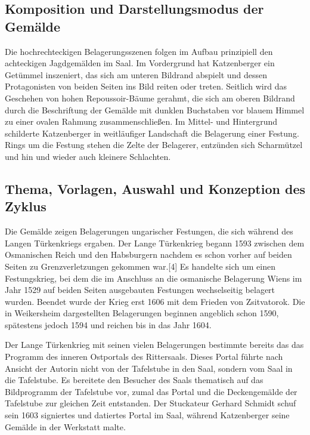 \documentclass[
  letterpaper,
]{book}
\begin{document}
\subsection{Komposition und Darstellungsmodus der
Gemälde}\label{komposition-und-darstellungsmodus-der-gemuxe4lde}

Die hochrechteckigen Belagerungsszenen folgen im Aufbau prinzipiell den
achteckigen Jagdgemälden im Saal. Im Vordergrund hat Katzenberger ein
Getümmel inszeniert, das sich am unteren Bildrand abspielt und dessen
Protagonisten von beiden Seiten ins Bild reiten oder treten. Seitlich
wird das Geschehen von hohen Repoussoir-Bäume gerahmt, die sich am
oberen Bildrand durch die Beschriftung der Gemälde mit dunklen
Buchstaben vor blauem Himmel zu einer ovalen Rahmung zusammenschließen.
Im Mittel- und Hintergrund schilderte Katzenberger in weitläufiger
Landschaft die Belagerung einer Festung. Rings um die Festung stehen die
Zelte der Belagerer, entzünden sich Scharmützel und hin und wieder auch
kleinere Schlachten.

\subsection{Thema, Vorlagen, Auswahl und Konzeption des
Zyklus}\label{thema-vorlagen-auswahl-und-konzeption-des-zyklus}

Die Gemälde zeigen Belagerungen ungarischer Festungen, die sich während
des Langen Türkenkriegs ergaben. Der Lange Türkenkrieg begann 1593
zwischen dem Osmanischen Reich und den Habsburgern nachdem es schon
vorher auf beiden Seiten zu Grenzverletzungen gekommen war.{[}4{]} Es
handelte sich um einen Festungskrieg, bei dem die im Anschluss an die
osmanische Belagerung Wiens im Jahr 1529 auf beiden Seiten ausgebauten
Festungen wechselseitig belagert wurden. Beendet wurde der Krieg erst
1606 mit dem Frieden von Zsitvatorok. Die in Weikersheim dargestellten
Belagerungen beginnen angeblich schon 1590, spätestens jedoch 1594 und
reichen bis in das Jahr 1604.

Der Lange Türkenkrieg mit seinen vielen Belagerungen bestimmte bereits
das das Programm des inneren Ostportals des Rittersaals. Dieses Portal
führte nach Ansicht der Autorin nicht von der Tafelstube in den Saal,
sondern vom Saal in die Tafelstube. Es bereitete den Besucher des Saals
thematisch auf das Bildprogramm der Tafelstube vor, zumal das Portal und
die Deckengemälde der Tafelstube zur gleichen Zeit entstanden. Der
Stuckateur Gerhard Schmidt schuf sein 1603 signiertes und datiertes
Portal im Saal, während Katzenberger seine Gemälde in der Werkstatt
malte.
\end{document}
